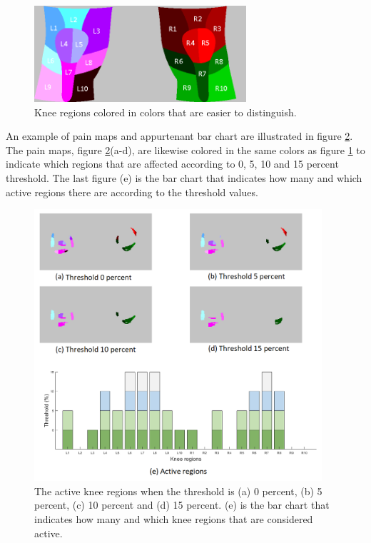 \begin{figure} [H]
\centering
\includegraphics[width=0.7\textwidth]{figures/colorregion}
\caption{Knee regions colored in colors that are easier to distinguish.}
\label{fig:colorregion}
\end{figure}

\noindent
An example of pain maps and appurtenant bar chart are illustrated in figure \ref{fig:threshold}. The pain maps, figure \ref{fig:threshold}(a-d), are likewise colored in the same colors as figure \ref{fig:colorregion} to indicate which regions that are affected according to 0, 5, 10 and 15 percent threshold. The last figure (e) is the bar chart that indicates how many and which active regions there are according to the threshold values.

\begin{figure} [H]
\centering
\includegraphics[width=0.95\textwidth]{figures/threshold4}
\caption{The active knee regions when the threshold is (a) 0 percent, (b) 5 percent, (c) 10 percent and (d) 15 percent. (e) is the bar chart that indicates how many and which knee regions that are considered active.}
\label{fig:threshold}
\end{figure}

